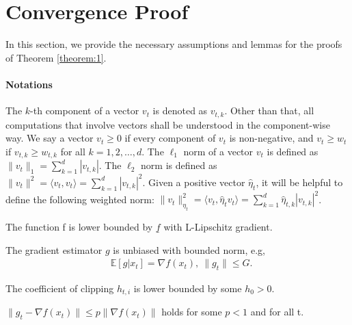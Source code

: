 \section{Convergence Proof}
\label{appendix_converge}



In this section, we provide the necessary assumptions and lemmas for the proofs of Theorem \ref{theorem:1}.

\paragraph{Notations}  The $k$-th component of a vector $v_t$ is denoted as ${v}_{t, k}$.  Other than that, all computations that involve vectors shall be understood in the component-wise way. We say a vector $v_t \geq 0$ if every component of $v_t$ is non-negative, and $v_t \geq w_t$ if $v_{t,k} \geq w_{t,k}$ for all $k=1, 2, \ldots, d$. The $\ell_1$ norm of a vector $v_t$ is defined as $\|v_t\|_1 = \sum_{k=1}^d |{v}_{t, k}|$. The $\ell_2$ norm is defined as $\|v_t\|^2 =\langle v_t, v_t \rangle = \sum_{k=1}^d |{v}_{t,k}|^2$. Given a positive vector $\hat{\eta}_t$, it will be helpful to define the following weighted norm: $\|v_t\|^2_{\eta_t} = \langle v_t, \hat{\eta}_t v_t \rangle = \sum_{k=1}^d \hat{\eta}_{t, k}|{v}_{t, k}|^2$.

\begin{assumption}
\label{assumption_1}
The function f is lower bounded by $\underline{f}$ with L-Lipschitz gradient.
\end{assumption}

\begin{assumption}
\label{assumption_2}
The gradient estimator $g$ is unbiased with bounded norm, e.g,
\[
\begin{split}
    &\mathbb{E}[g|x_t] =\nabla f(x_t), \ \|g_t\| \leq G. 
\end{split}
\]
\end{assumption}


\begin{assumption}
\label{assumption_3}
The coefficient of clipping $h_{t,i}$ is lower bounded by some $h_0>0$.
\end{assumption}



\begin{assumption}
\label{assumption_4}
$\|g_t - \nabla f(x_t)\| \leq p \|\nabla f(x_t)\|$ holds for some $p<1$ and for all t.
\end{assumption}


